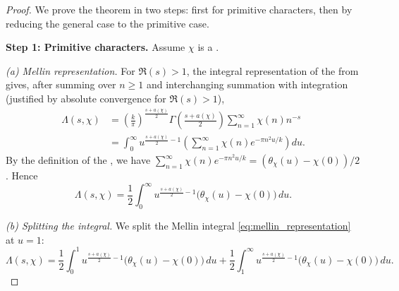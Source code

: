 \begin{proof}
We prove the theorem in two steps: first for primitive characters, then by reducing the general case to the primitive case.

\noindent \textbf{Step 1: Primitive characters.} Assume $\chi$ is a .

\medskip
\noindent \emph{(a) Mellin representation.} For $\Re(s) > 1$, the integral representation of the  from  gives, after summing over $n \geq 1$ and interchanging summation with integration (justified by absolute convergence for $\Re(s) > 1$),
\begin{align*}
\Lambda(s, \chi) &= \left( \frac{k}{\pi} \right)^{\!\frac{s + a(\chi)}{2}} \Gamma\!\left( \frac{s + a(\chi)}{2} \right) \sum_{n=1}^\infty \chi(n) n^{-s} \\
&= \int_0^\infty u^{\frac{s + a(\chi)}{2} - 1} \left( \sum_{n=1}^\infty \chi(n) e^{-\pi n^2 u / k} \right) du.
\end{align*}
By the definition of the , we have $\sum_{n=1}^\infty \chi(n) e^{-\pi n^2 u / k} = (\theta_\chi(u) - \chi(0))/2$. Hence
\begin{equation}\label{eq:mellin_representation}
\Lambda(s, \chi) = \frac{1}{2} \int_0^\infty u^{\frac{s + a(\chi)}{2} - 1} \bigl( \theta_\chi(u) - \chi(0) \bigr) \, du.
\end{equation}

\medskip
\noindent \emph{(b) Splitting the integral.} We split the Mellin integral \eqref{eq:mellin_representation} at $u = 1$:
\begin{equation}\label{eq:split_integral}
\Lambda(s, \chi) = \frac{1}{2} \int_0^1 u^{\frac{s + a(\chi)}{2} - 1} \bigl( \theta_\chi(u) - \chi(0) \bigr) \, du
+ \frac{1}{2} \int_1^\infty u^{\frac{s + a(\chi)}{2} - 1} \bigl( \theta_\chi(u) - \chi(0) \bigr) \, du.
\end{equation}


\end{proof}
